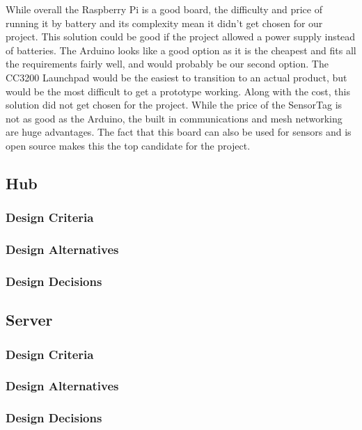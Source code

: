 \documentclass[ppfs.tex]{template/subfiles}
\begin{document}
While overall the Raspberry Pi is a good board, the difficulty and price of running it by battery and its complexity mean it didn’t get chosen for our project. This solution could be good if the project allowed a power supply instead of batteries. The Arduino looks like a good option as it is the cheapest and fits all the requirements fairly well, and would probably be our second option. The CC3200 Launchpad would be the easiest to transition to an actual product, but would be the most difficult to get a prototype working. Along with the cost, this solution did not get chosen for the project. While the price of the SensorTag is not as good as the Arduino, the built in communications and mesh networking are huge advantages. The fact that this board can also be used for sensors and is open source makes this the top candidate for the project.

\subsection{Hub}

\subsubsection{Design Criteria}

\subsubsection{Design Alternatives}

\subsubsection{Design Decisions}

\subsection{Server}

\subsubsection{Design Criteria}

\subsubsection{Design Alternatives}

\subsubsection{Design Decisions}
\end{document}
